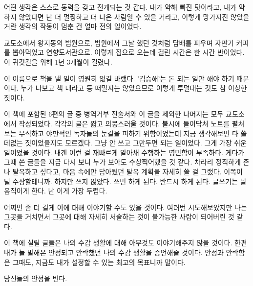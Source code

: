 \documentclass[12pt, b6paper, openany]{memoir}
\newenvironment{article}{}{}
\begin{document}
\begin{article}
어떤 생각은 스스로 동력을 갖고 전개되는 것 같다. 내가 약해 빠진 탓이라고, 내가 약하지 않았다면 난 더 멀쩡하고 더 나은 사람일 수 있을 거라고, 이렇게 망가지진 않았을 거란 생각의 작동이 멈춘 건 얼마 전의 일이었다.

교도소에서 왕지동의 법원으로, 법원에서 그날 했던 것처럼 담배를 피우며 자판기 커피를 뽑아먹었고 연향도서관으로. 이렇게 집으로 오는데 걸린 시간은 한 시간 반이었다. 이 귀갓길을 위해 1년 3개월이 걸렸다.

이 이름으로 책을 낼 일이 영원히 없길 바랬다. '김승해'는 돈 되는 일만 해야 하기 때문이다. 누가 나보고 책 내라고 등 떠밀지는 않았으므로 이렇게 투덜대는 것도 참 이상한 짓이다.

이 책에 포함된 6편의 글 중 병역거부 진술서와 이 글을 제외한 나머지는 모두 교도소에서 작성되었다. 각각의 글은 짧고 의뭉스러울 것이다. 불시에 들이닥쳐 노트를 펼쳐보는 무식하고 야만적인 독자들의 눈길을 피하기 위함이었는데 지금 생각해보면 다 쓸데없는 짓이었을지도 모르겠다. 그냥 안 쓰고 그만두면 되는 일이었다. 그게 가장 쉬운 일이었을 것이다. 내겐 이런 걸 재빠르게 알아채 수행하는 영민함이 부족하다. 게다가 그때 쓴 글들을 지금 다시 보니 누가 보아도 수상쩍어했을 것 같다. 차라리 정직하게 존나 탈옥하고 싶다고, 마음 속에만 담아뒀던 탈옥 계획을 자세히 쓸 걸 그랬다. 이쪽이 덜 수상할테니까. 하지만 쓰지 않았다. 쓰면 하게 된다. 반드시 하게 된다. 글쓰기는 날 움직이게 한다. 난 이게 가장 두렵다.

어쩌면 좀 더 길게 이에 대해 이야기할 수도 있을 것이다. 여러번 시도해보았지만 나는 그곳을 거치면서 그곳에 대해 자세히 서술하는 것이 불가능한 사람이 되어버린 것 같다.

이 책에 실릴 글들은 나의 수감 생활에 대해 아무것도 이야기해주지 않을 것이다. 한편 내가 늘 말해온 안정되고 안락했던 나의 수감 생활을 증언해줄 것이다. 안정과 안락함은 그때도, 지금도 내가 설정할 수 있는 최고의 목표니까 말이다.

당신들의 안정을 빈다.
\end{article}

\backmatter
\end{document}
